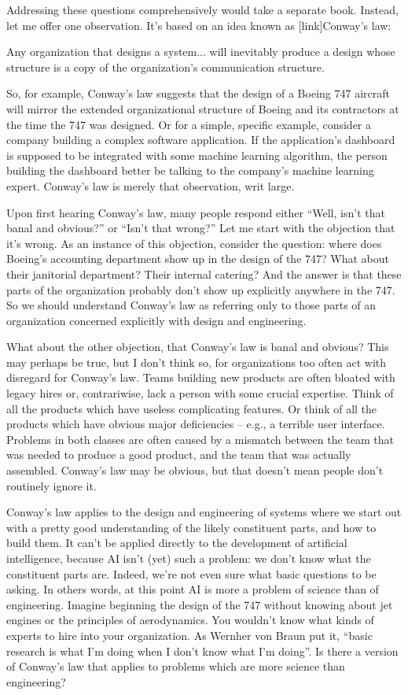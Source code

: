 \documentclass[a4paper,twoside,10pt]{book}
\begin{document}
Addressing these questions comprehensively would take a separate book. Instead, let me offer one observation. It's based on an idea known as [link]Conway's law:
\begin{adjustwidth}{1.5cm}{0.5cm}
Any organization that designs a system... will inevitably produce a design whose structure is a copy of the organization's communication structure.
\end{adjustwidth}
So, for example, Conway's law suggests that the design of a Boeing 747 aircraft will mirror the extended organizational structure of Boeing and its contractors at the time the 747 was designed. Or for a simple, specific example, consider a company building a complex software application. If the application's dashboard is supposed to be integrated with some machine learning algorithm, the person building the dashboard better be talking to the company's machine learning expert. Conway's law is merely that observation, writ large.

Upon first hearing Conway's law, many people respond either ``Well, isn't that banal and obvious?'' or ``Isn't that wrong?'' Let me start with the objection that it's wrong. As an instance of this objection, consider the question: where does Boeing's accounting department show up in the design of the 747? What about their janitorial department? Their internal catering? And the answer is that these parts of the organization probably don't show up explicitly anywhere in the 747. So we should understand Conway's law as referring only to those parts of an organization concerned explicitly with design and engineering.

What about the other objection, that Conway's law is banal and obvious? This may perhaps be true, but I don't think so, for organizations too often act with disregard for Conway's law. Teams building new products are often bloated with legacy hires or, contrariwise, lack a person with some crucial expertise. Think of all the products which have useless complicating features. Or think of all the products which have obvious major deficiencies -- e.g., a terrible user interface. Problems in both classes are often caused by a mismatch between the team that was needed to produce a good product, and the team that was actually assembled. Conway's law may be obvious, but that doesn't mean people don't routinely ignore it.

Conway's law applies to the design and engineering of systems where we start out with a pretty good understanding of the likely constituent parts, and how to build them. It can't be applied directly to the development of artificial intelligence, because AI isn't (yet) such a problem: we don't know what the constituent parts are. Indeed, we're not even sure what basic questions to be asking. In others words, at this point AI is more a problem of science than of engineering. Imagine beginning the design of the 747 without knowing about jet engines or the principles of aerodynamics. You wouldn't know what kinds of experts to hire into your organization. As Wernher von Braun put it, ``basic research is what I'm doing when I don't know what I'm doing''. Is there a version of Conway's law that applies to problems which are more science than engineering?
\end{document}
